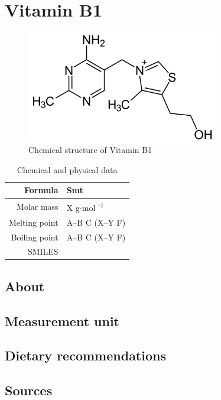 \documentclass{book}
\begin{document}
\chapter{Vitamin B1}
\begin{figure}[h]
	\caption{Chemical structure of Vitamin B1}
	\centering \includegraphics[width=0.75\textwidth]{images/Vitamin_B1_chemical_structure}
\end{figure}

\begin{table}[h]
	\caption{Chemical and physical data}
	\centering \begin{tabular}{| r | l |}
		\hline
		Formula & Smt\\ \hline
		Molar mass & X g$\cdot$mol \textsuperscript{-1}\\ \hline
		Melting point & A--B \degree C (X--Y \degree F)\\ \hline
		Boiling point & A--B \degree C (X--Y \degree F)\\ \hline
		SMILES & \\ \hline
	\end{tabular}
\end{table}
\newpage

\section{About}


\section{Measurement unit}


\section{Dietary recommendations}


\section{Sources}
\end{document}
